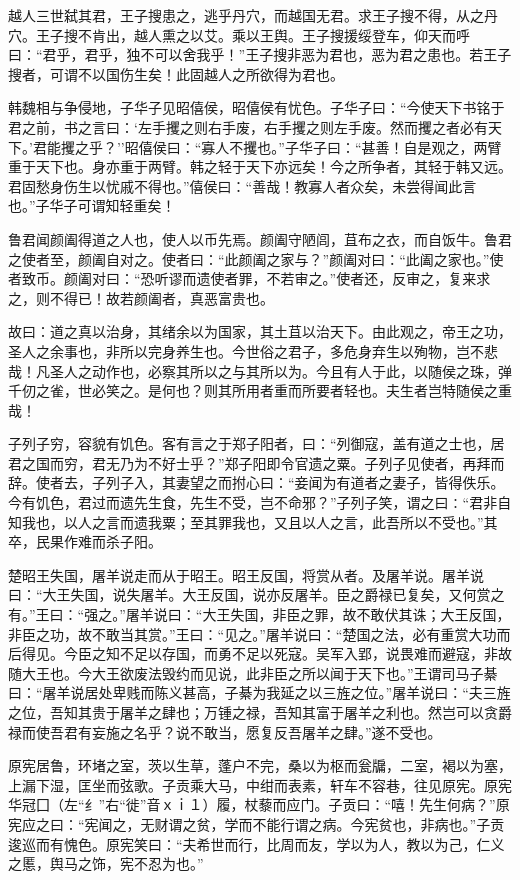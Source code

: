 \documentclass[]{article}
\begin{document}
越人三世弑其君，王子搜患之，逃乎丹穴，而越国无君。求王子搜不得，从之丹穴。王子搜不肯出，越人熏之以艾。乘以王舆。王子搜援绥登车，仰天而呼曰：``君乎，君乎，独不可以舍我乎！''王子搜非恶为君也，恶为君之患也。若王子搜者，可谓不以国伤生矣！此固越人之所欲得为君也。

韩魏相与争侵地，子华子见昭僖侯，昭僖侯有忧色。子华子曰：``今使天下书铭于君之前，书之言曰：`左手攫之则右手废，右手攫之则左手废。然而攫之者必有天下。'君能攫之乎？''昭僖侯曰：``寡人不攫也。''子华子曰：``甚善！自是观之，两臂重于天下也。身亦重于两臂。韩之轻于天下亦远矣！今之所争者，其轻于韩又远。君固愁身伤生以忧戚不得也。''僖侯曰：``善哉！教寡人者众矣，未尝得闻此言也。''子华子可谓知轻重矣！

鲁君闻颜阖得道之人也，使人以币先焉。颜阖守陋闾，苴布之衣，而自饭牛。鲁君之使者至，颜阖自对之。使者曰：``此颜阖之家与？''颜阖对曰：``此阖之家也。''使者致币。颜阖对曰：``恐听谬而遗使者罪，不若审之。''使者还，反审之，复来求之，则不得已！故若颜阖者，真恶富贵也。

故曰：道之真以治身，其绪余以为国家，其土苴以治天下。由此观之，帝王之功，圣人之余事也，非所以完身养生也。今世俗之君子，多危身弃生以殉物，岂不悲哉！凡圣人之动作也，必察其所以之与其所以为。今且有人于此，以随侯之珠，弹千仞之雀，世必笑之。是何也？则其所用者重而所要者轻也。夫生者岂特随侯之重哉！

子列子穷，容貌有饥色。客有言之于郑子阳者，曰：``列御寇，盖有道之士也，居君之国而穷，君无乃为不好士乎？''郑子阳即令官遗之粟。子列子见使者，再拜而辞。使者去，子列子入，其妻望之而拊心曰：``妾闻为有道者之妻子，皆得佚乐。今有饥色，君过而遗先生食，先生不受，岂不命邪？''子列子笑，谓之曰∶``君非自知我也，以人之言而遗我粟；至其罪我也，又且以人之言，此吾所以不受也。''其卒，民果作难而杀子阳。

楚昭王失国，屠羊说走而从于昭王。昭王反国，将赏从者。及屠羊说。屠羊说曰：``大王失国，说失屠羊。大王反国，说亦反屠羊。臣之爵禄已复矣，又何赏之有。''王曰：``强之。''屠羊说曰：``大王失国，非臣之罪，故不敢伏其诛；大王反国，非臣之功，故不敢当其赏。''王曰：``见之。''屠羊说曰：``楚国之法，必有重赏大功而后得见。今臣之知不足以存国，而勇不足以死寇。吴军入郢，说畏难而避寇，非故随大王也。今大王欲废法毁约而见说，此非臣之所以闻于天下也。''王谓司马子綦曰：``屠羊说居处卑贱而陈义甚高，子綦为我延之以三旌之位。''屠羊说曰：``夫三旌之位，吾知其贵于屠羊之肆也；万锺之禄，吾知其富于屠羊之利也。然岂可以贪爵禄而使吾君有妄施之名乎？说不敢当，愿复反吾屠羊之肆。''遂不受也。

原宪居鲁，环堵之室，茨以生草，蓬户不完，桑以为枢而瓮牖，二室，褐以为塞，上漏下湿，匡坐而弦歌。子贡乘大马，中绀而表素，轩车不容巷，往见原宪。原宪华冠囗（左``纟''右``徙''音ｘｉ１）履，杖藜而应门。子贡曰：``嘻！先生何病？''原宪应之曰：``宪闻之，无财谓之贫，学而不能行谓之病。今宪贫也，非病也。''子贡逡巡而有愧色。原宪笑曰：``夫希世而行，比周而友，学以为人，教以为己，仁义之慝，舆马之饰，宪不忍为也。''
\end{document}

